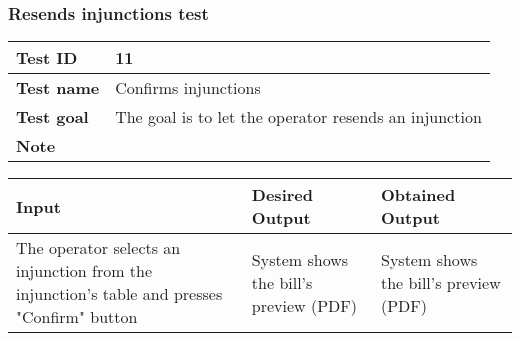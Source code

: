 {{		\subsubsection{Resends injunctions test}{
			\begin{center}
			\begin{tabular}{|p{4cm}|p{10cm}|}
			\hline
				\centering \vspace{1mm} \bfseries{Test ID} \vspace{1mm} & 
				\vspace{1mm} 11 \vspace{1mm}\\
			\hline
				\centering \vspace{1mm} \bfseries{Test name} \vspace{1mm} & 
				\vspace{1mm} Confirms injunctions \vspace{1mm}\\
			\hline
				\centering \vspace{1mm} \bfseries{Test goal} \vspace{1mm} & 
				\vspace{1mm} The goal is to let the operator resends an injunction\vspace{1mm}\\
			\hline
				\centering \vspace{1mm} \bfseries{Note} \vspace{1mm} & 
				\vspace{1mm}  \vspace{1mm}\\
			\hline
			\end{tabular}

			\begin{tabular}{|p{4cm}|p{5cm}|p{5cm}|}
			\hline
			\centering \vspace{1mm} \bfseries{Input} \vspace{1mm} & \vspace{1mm} \bfseries{Desired Output} \vspace{1mm} & \vspace{1mm} \bfseries{Obtained Output} \vspace{1mm}\\
			\hline
				\vspace{1mm} The operator selects an injunction from the injunction's table and presses "Confirm" button \vspace{1mm} &
				\vspace{1mm} System shows the bill's preview (PDF) \vspace{1mm} & 
				\vspace{1mm} System shows the bill's preview (PDF) \vspace{1mm} \\
			\hline
			\end{tabular}
			\end{center}
		}
		\clearpage
	}
}